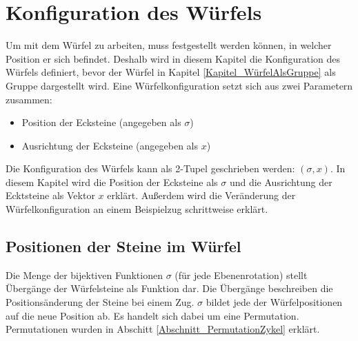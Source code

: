 \documentclass[12pt,a4paper, usenames, dvipsnames]{article}
\theoremstyle{mystyle}
\theoremstyle{definition}
\newtheorem{bsp}{Beispiel}[definition]
\begin{document}
%
%
%
%
%
%
%
%
%
%
\newpage

\section{Konfiguration des Würfels}

\label{Kapitel_KonfigurationDesWürfels}

Um mit dem Würfel zu arbeiten, muss festgestellt werden können, in welcher Position er sich befindet.
Deshalb wird in diesem Kapitel die Konfiguration des Würfels definiert, bevor der Würfel in Kapitel \ref{Kapitel_WürfelAlsGruppe} als Gruppe dargestellt wird. Eine Würfelkonfiguration setzt sich aus zwei Parametern zusammen: 
\begin{itemize}
\item Position der Ecksteine (angegeben als $\sigma$)
\item Ausrichtung der Ecksteine (angegeben als $x$)
\end{itemize}
Die Konfiguration des Würfels kann als 2-Tupel geschrieben werden: $(\sigma, x)$.
In diesem Kapitel wird die Position der Ecksteine als $\sigma$ und die Ausrichtung der Ecktsteine als Vektor $x$ erklärt. Außerdem wird die Veränderung der Würfelkonfiguration an einem Beispielzug schrittweise erklärt.

%
%
%
%
%
%
%
%
%
%
%
%
%
%
%
%
%
%
%
%

\subsection{Positionen der Steine im Würfel} 

\label{Abschnitt_PositionenDerSteineImWürfel}

Die Menge der bijektiven Funktionen $\sigma$ (für jede Ebenenrotation) stellt Übergänge der Würfelsteine als Funktion dar. Die Übergänge beschreiben die Positionsänderung der Steine bei einem Zug. $\sigma$ bildet jede der Würfelpositionen auf die neue Position ab. Es handelt sich dabei um eine Permutation. Permutationen wurden in Abschitt \ref{Abschnitt_PermutationZykel} erklärt. 
\end{document}
